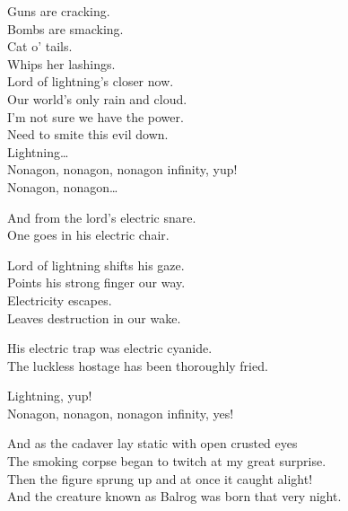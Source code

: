 Guns are cracking. \\
Bombs are smacking. \\
Cat o' tails. \\
Whips her lashings. \\

Lord of lightning's closer now. \\
Our world's only rain and cloud. \\
I'm not sure we have the power. \\
Need to smite this evil down. \\

Lightning… \\

Nonagon, nonagon, nonagon infinity, yup! \\
Nonagon, nonagon… \\


And from the lord's electric snare. \\
One goes in his electric chair. \\


Lord of lightning shifts his gaze. \\
Points his strong finger our way. \\
Electricity escapes. \\
Leaves destruction in our wake. \\


His electric trap was electric cyanide. \\
The luckless hostage has been thoroughly fried. \\


Lightning, yup! \\

Nonagon, nonagon, nonagon infinity, yes! \\


And as the cadaver lay static with open crusted eyes \\
The smoking corpse began to twitch at my great surprise. \\

Then the figure sprung up and at once it caught alight! \\
And the creature known as Balrog was born that very night. \\

